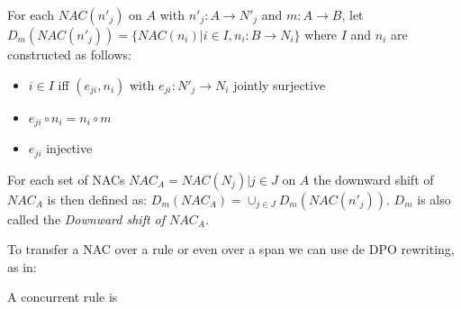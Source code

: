 \begin{definition}


For each $NAC(n'_j)$ on $A$ with $n'_j : A \rightarrow N'_j$ and $m : A \rightarrow B$, 
let $D_m(NAC(n'_j)) = \{ NAC(n_i)|i \in I, n_i : B \rightarrow N_i \}$ where $I$ and $n_i$ 
are constructed as follows:
\begin{itemize}
  \item $i \in I$ iff $(e_{ji}, n_i)$ with $e_{ji} : N'_j \rightarrow N_i$ jointly surjective 
  \item $e_{ji} \circ n_i = n_i \circ m$
  \item $e_{ji}$ injective
\end{itemize}

For each set of NACs $NAC_A = {NAC(N_j)| j \in J}$ on $A$ the downward shift of $NAC_A$ is then defined as: $D_m(NAC_A) = \cup_{j \in J}D_m(NAC(n'_j))$. $D_m$ is also called the \emph{Downward shift of $NAC_A$}.

\end{definition}

\begin{definition}\label{def:shift-nac} To transfer a NAC over a rule or even over a span we can use de DPO rewriting, as in:


\end{definition}

\begin{definition}

A concurrent rule is
\end{definition}

\centerline{
}

